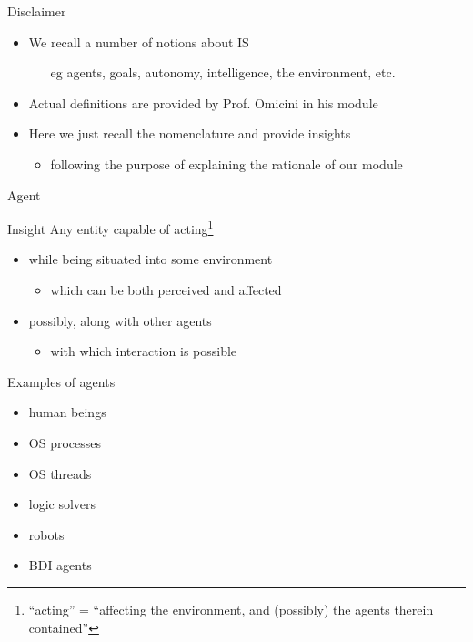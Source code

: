 \documentclass[presentation]{beamer}\mode<presentation>{\usetheme{AMSBolognaFC}}
\begin{document}
\begin{frame}[c]{Disclaimer}
%
\begin{itemize}
	\item We recall a number of notions about IS
	\begin{itemize}
		\item[eg] agents, goals, autonomy, intelligence, the environment, etc. 
	\end{itemize}

	\item Actual definitions are provided by Prof. Omicini in his module
	
	\item Here we just recall the nomenclature and provide insights
	\begin{itemize}
		\item following the purpose of explaining the rationale of our module
	\end{itemize}
\end{itemize}
%
\end{frame}

\begin{frame}[c]{Agent}
%
\begin{block}{Insight}
	Any entity capable of \alert{acting}\footnote{``acting'' = ``affecting the environment, and (possibly) the agents therein contained''}
	\begin{itemize}
		\item while being situated into some \alert{environment}
		\begin{itemize}
			\item which can be both \alert{perceived} and \alert{affected}
		\end{itemize}

		\item possibly, along with other agents
		\begin{itemize}
			\item with which \alert{interaction} is possible
		\end{itemize}
	\end{itemize}
\end{block}
%
\begin{exampleblock}{Examples of agents}
	\begin{multicols}{2}
		\begin{itemize}
			\item human beings
			\item OS processes
			\item OS threads
			\item logic solvers
			\item robots
			\item BDI agents
		\end{itemize}
	\end{multicols}
\end{exampleblock}
%
\end{frame}
\end{document}
